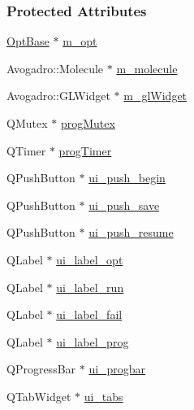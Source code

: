 \subsubsection*{Protected Attributes}
\begin{DoxyCompactItemize}
\item 
\hyperlink{classGlobalSearch_1_1OptBase}{Opt\+Base} $\ast$ \hyperlink{classGlobalSearch_1_1AbstractDialog_a6a5b08f59d1521ebc4769e9e9903346b}{m\+\_\+opt}
\item 
Avogadro\+::\+Molecule $\ast$ \hyperlink{classGlobalSearch_1_1AbstractDialog_a9cf65fe592eebca0ec72a5597edc7faf}{m\+\_\+molecule}
\item 
Avogadro\+::\+G\+L\+Widget $\ast$ \hyperlink{classGlobalSearch_1_1AbstractDialog_a18c6963416c0b49012fa94fd451c96d9}{m\+\_\+gl\+Widget}
\item 
Q\+Mutex $\ast$ \hyperlink{classGlobalSearch_1_1AbstractDialog_a06e3b73c319208a706aaf629a5f05165}{prog\+Mutex}
\item 
Q\+Timer $\ast$ \hyperlink{classGlobalSearch_1_1AbstractDialog_a1cf317e8206fd80628a9fe6d2ec711fc}{prog\+Timer}
\item 
Q\+Push\+Button $\ast$ \hyperlink{classGlobalSearch_1_1AbstractDialog_a526c9ad4ea52454ba41be74de24cdd6c}{ui\+\_\+push\+\_\+begin}
\item 
Q\+Push\+Button $\ast$ \hyperlink{classGlobalSearch_1_1AbstractDialog_a695ed25af57ce8c854e21d3f2c18e250}{ui\+\_\+push\+\_\+save}
\item 
Q\+Push\+Button $\ast$ \hyperlink{classGlobalSearch_1_1AbstractDialog_a04a1131601c5eab39ef105f385aceca5}{ui\+\_\+push\+\_\+resume}
\item 
Q\+Label $\ast$ \hyperlink{classGlobalSearch_1_1AbstractDialog_af30548b5ed4d5a22a7dc648afae4115b}{ui\+\_\+label\+\_\+opt}
\item 
Q\+Label $\ast$ \hyperlink{classGlobalSearch_1_1AbstractDialog_af65c818f2bf846bcd76aa0e755e13453}{ui\+\_\+label\+\_\+run}
\item 
Q\+Label $\ast$ \hyperlink{classGlobalSearch_1_1AbstractDialog_a28b127a410ed219e13a0e85c889934e7}{ui\+\_\+label\+\_\+fail}
\item 
Q\+Label $\ast$ \hyperlink{classGlobalSearch_1_1AbstractDialog_a21e1395aea6ac29a9c97b7ec2f54eb14}{ui\+\_\+label\+\_\+prog}
\item 
Q\+Progress\+Bar $\ast$ \hyperlink{classGlobalSearch_1_1AbstractDialog_a9b91400d03e9c7f3e94bf6b1f91bb97a}{ui\+\_\+progbar}
\item 
Q\+Tab\+Widget $\ast$ \hyperlink{classGlobalSearch_1_1AbstractDialog_acc93d22a99eb7c11610494ce754b1502}{ui\+\_\+tabs}
\end{DoxyCompactItemize}


